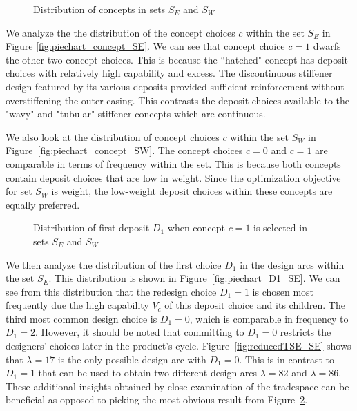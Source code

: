 \begin{figure}[h!]
	\centering
	\caption{Distribution of concepts in sets $S_E$ and $S_W$}
	\label{fig:piechart_concept}
\end{figure}

We analyze the the distribution of the concept choices $c$ within the set $S_E$ in Figure \ref{fig:piechart_concept_SE}. We can see that concept choice $c=1$ dwarfs the other two concept choices. This is because the ``hatched" concept has deposit choices with relatively high capability and excess. The discontinuous stiffener design featured by its various deposits provided sufficient reinforcement without overstiffening the outer casing. This contrasts the deposit choices available to the "wavy" and "tubular" stiffener concepts which are continuous.

We also look at the distribution of concept choices $c$ within the set $S_W$ in Figure~\ref{fig:piechart_concept_SW}. The concept choices $c=0$ and $c=1$ are comparable in terms of frequency within the set. This is because both concepts contain deposit choices that are low in weight. Since the optimization objective for set $S_W$ is weight, the low-weight deposit choices within these concepts are equally preferred.

\begin{figure}[h!]
	\centering
	\caption{Distribution of first deposit $D_1$ when concept $c=1$ is selected in sets $S_E$ and $S_W$}
	\label{fig:piechart_D1}
\end{figure}

We then analyze the distribution of the first choice $D_1$ in the design arcs within the set $S_E$. This distribution is shown in Figure~\ref{fig:piechart_D1_SE}. We can see from this distribution that the redesign choice $D_1 = 1$ is chosen most frequently due the high capability $V_c$ of this deposit choice and its children. The third most common design choice is $D_1 = 0$, which is comparable in frequency to $D_1 = 2$. However, it should be noted that committing to $D_1 = 0$ restricts the designers' choices later in the product's cycle. Figure~\ref{fig:reducedTSE_SE} shows that $\lambda = 17$ is the only possible design arc with $D_1 = 0$. This is in contrast to $D_1 = 1$ that can be used to obtain two different design arcs $\lambda = 82$ and $\lambda = 86$. These additional insights obtained by close examination of the tradespace can be beneficial as opposed to picking the most obvious result from Figure~\ref{fig:piechart_D1}.

